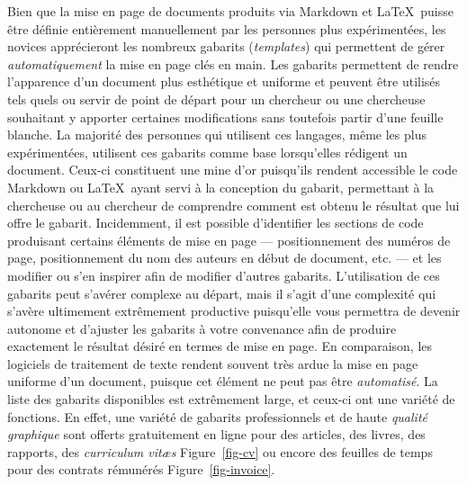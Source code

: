 \documentclass[
  letterpaper,
]{scrbook}
\begin{document}
Bien que la mise en page de documents produits via Markdown et
\LaTeX~puisse être définie entièrement manuellement par les personnes
plus expérimentées, les novices apprécieront les nombreux gabarits
(\emph{templates}) qui permettent de gérer \emph{automatiquement} la
mise en page clés en main. Les gabarits permettent de rendre l'apparence
d'un document plus esthétique et uniforme et peuvent être utilisés tels
quels ou servir de point de départ pour un chercheur ou une chercheuse
souhaitant y apporter certaines modifications sans toutefois partir
d'une feuille blanche. La majorité des personnes qui utilisent ces
langages, même les plus expérimentées, utilisent ces gabarits comme base
lorsqu'elles rédigent un document. Ceux-ci constituent une mine d'or
puisqu'ils rendent accessible le code Markdown ou \LaTeX~ayant servi à
la conception du gabarit, permettant à la chercheuse ou au chercheur de
comprendre comment est obtenu le résultat que lui offre le gabarit.
Incidemment, il est possible d'identifier les sections de code
produisant certains éléments de mise en page --- positionnement des
numéros de page, positionnement du nom des auteurs en début de document,
etc. --- et les modifier ou s'en inspirer afin de modifier d'autres
gabarits. L'utilisation de ces gabarits peut s'avérer complexe au
départ, mais il s'agit d'une complexité qui s'avère ultimement
extrêmement productive puisqu'elle vous permettra de devenir autonome et
d'ajuster les gabarits à votre convenance afin de produire exactement le
résultat désiré en termes de mise en page. En comparaison, les logiciels
de traitement de texte rendent souvent très ardue la mise en page
uniforme d'un document, puisque cet élément ne peut pas être
\emph{automatisé}. La liste des gabarits disponibles est extrêmement
large, et ceux-ci ont une variété de fonctions. En effet, une variété de
gabarits professionnels et de haute \emph{qualité graphique} sont
offerts gratuitement en ligne pour des articles, des livres, des
rapports, des \emph{curriculum vitæs} Figure~\ref{fig-cv} ou encore des
feuilles de temps pour des contrats rémunérés Figure~\ref{fig-invoice}.
\end{document}
